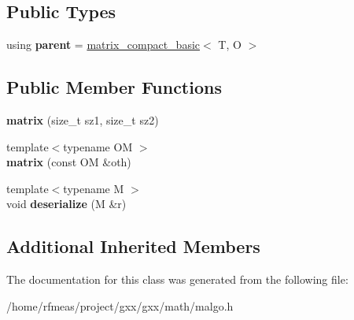 \subsection*{Public Types}
\begin{DoxyCompactItemize}
\item 
using {\bfseries parent} = \hyperlink{classmalgo_1_1matrix__compact__basic}{matrix\+\_\+compact\+\_\+basic}$<$ T, O $>$\hypertarget{classmalgo_1_1matrix_a83ca1a501f5a046e991f2ffbd15921ac}{}\label{classmalgo_1_1matrix_a83ca1a501f5a046e991f2ffbd15921ac}

\end{DoxyCompactItemize}
\subsection*{Public Member Functions}
\begin{DoxyCompactItemize}
\item 
{\bfseries matrix} (size\+\_\+t sz1, size\+\_\+t sz2)\hypertarget{classmalgo_1_1matrix_a74a585fae088b31049e55a59ab2022df}{}\label{classmalgo_1_1matrix_a74a585fae088b31049e55a59ab2022df}

\item 
{\footnotesize template$<$typename OM $>$ }\\{\bfseries matrix} (const OM \&oth)\hypertarget{classmalgo_1_1matrix_ade27b5bab61c40a183e7c71888d66edb}{}\label{classmalgo_1_1matrix_ade27b5bab61c40a183e7c71888d66edb}

\item 
{\footnotesize template$<$typename M $>$ }\\void {\bfseries deserialize} (M \&r)\hypertarget{classmalgo_1_1matrix_a70054b2467b19dbdf9bad6f85eda44da}{}\label{classmalgo_1_1matrix_a70054b2467b19dbdf9bad6f85eda44da}

\end{DoxyCompactItemize}
\subsection*{Additional Inherited Members}


The documentation for this class was generated from the following file\+:\begin{DoxyCompactItemize}
\item 
/home/rfmeas/project/gxx/gxx/math/malgo.\+h\end{DoxyCompactItemize}
